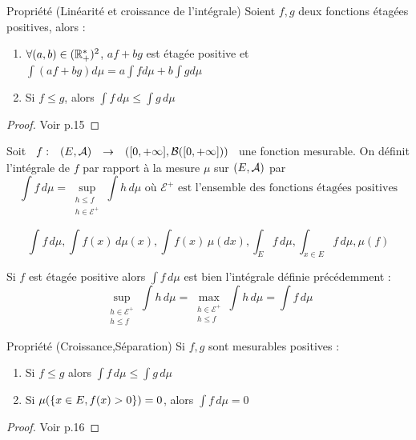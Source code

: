 \documentclass[]{report}
\begin{document}
\begin{prop}{Propriété (Linéarité et croissance de l'intégrale)}{}
    Soient $f,g$ deux fonctions étagées positives, alors :
    \begin{enumerate}
        \item $\forall(a,b)\in(\mathbb{R}^*_+)^2$, $af+bg$ est étagée positive et $\int(af+bg)d\mu=a\int fd\mu+b\int gd\mu$
        \item Si $f\le g$, alors $\int f\,d\mu\le\int g\,d\mu$
    \end{enumerate}
\end{prop}

\begin{proof}{}{}
    Voir p.15
\end{proof}

\begin{df}{}{}
    Soit $\begin{array}{ccccc} f : & (E,\mathcal{A}) & \to & ([0,+\infty],\mathcal{B}([0,+\infty])) \end{array}$ une fonction mesurable. On définit l'intégrale de $f$ par rapport à la mesure $\mu$ sur $(E,\mathcal{A})$ par
    $$\int f\,d\mu=\sup_{\substack{h\le f\\h\in\mathcal{E}^+}}\int h\,d\mu\text{ où }\mathcal{E}^+\text{ est l'ensemble des fonctions étagées positives}$$
\end{df}

\begin{nt}{}{}
    \[ \int f\,d\mu,\int f(x)\,d\mu(x),\int f(x)\,\mu(dx),\int_E f\,d\mu,\int_{x\in E} f\,d\mu,\mu(f)\]
\end{nt}

\begin{re}{}{}
    Si $f$ est étagée positive alors $\int f\,d\mu$ est bien l'intégrale définie précédemment :
    $$\sup_{\substack{h\in\mathcal{E^+}\\h\le f}}\int h\,d\mu=\max_{\substack{h\in\mathcal{E^+}\\h\le f}}\int h\,d\mu=\int f\,d\mu$$
\end{re}

\begin{prop}{Propriété (Croissance,Séparation)}{}
    Si $f,g$ sont mesurables positives :
    \begin{enumerate}
        \item Si $f\le g$ alors $\int f\,d\mu\le\int g\,d\mu$
        \item Si $\mu(\left\{ x\in E,f(x)>0 \right\})=0$, alors $\int f\,d\mu=0$
    \end{enumerate}
\end{prop}

\begin{proof}{}{}
    Voir p.16
\end{proof}
\end{document}
